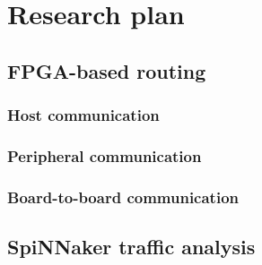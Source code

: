 \chapter{Research plan}
	
	
	\section{FPGA-based routing}
		
		
		\subsection{Host communication}
			
		
		\subsection{Peripheral communication}
			
		
		\subsection{Board-to-board communication}
			
	
	
	\section{SpiNNaker traffic analysis}
		
	

